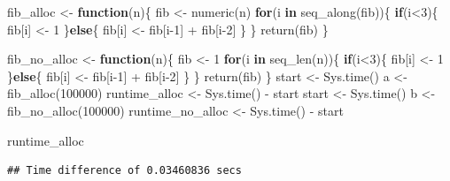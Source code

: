 \documentclass[
]{book}
\newenvironment{Shaded}{\begin{snugshade}}{\end{snugshade}}
\newcommand{\ControlFlowTok}[1]{\textcolor[rgb]{0.13,0.29,0.53}{\textbf{#1}}}
\newcommand{\DecValTok}[1]{\textcolor[rgb]{0.00,0.00,0.81}{#1}}
\newcommand{\FunctionTok}[1]{\textcolor[rgb]{0.00,0.00,0.00}{#1}}
\newcommand{\NormalTok}[1]{#1}
\newcommand{\OtherTok}[1]{\textcolor[rgb]{0.56,0.35,0.01}{#1}}
\newcommand{\SpecialCharTok}[1]{\textcolor[rgb]{0.00,0.00,0.00}{#1}}
\begin{document}
\begin{Shaded}
\begin{Highlighting}[]
\NormalTok{fib\_alloc }\OtherTok{\textless{}{-}} \ControlFlowTok{function}\NormalTok{(n)\{}
\NormalTok{  fib }\OtherTok{\textless{}{-}} \FunctionTok{numeric}\NormalTok{(n)}
  \ControlFlowTok{for}\NormalTok{(i }\ControlFlowTok{in} \FunctionTok{seq\_along}\NormalTok{(fib))\{}
    \ControlFlowTok{if}\NormalTok{(i}\SpecialCharTok{\textless{}}\DecValTok{3}\NormalTok{)\{ }
\NormalTok{      fib[i] }\OtherTok{\textless{}{-}} \DecValTok{1}
\NormalTok{    \}}\ControlFlowTok{else}\NormalTok{\{}
\NormalTok{      fib[i] }\OtherTok{\textless{}{-}}\NormalTok{ fib[i}\DecValTok{{-}1}\NormalTok{] }\SpecialCharTok{+}\NormalTok{ fib[i}\DecValTok{{-}2}\NormalTok{] }
\NormalTok{    \}}
\NormalTok{  \}}
  \FunctionTok{return}\NormalTok{(fib)}
\NormalTok{\}}


\NormalTok{fib\_no\_alloc }\OtherTok{\textless{}{-}} \ControlFlowTok{function}\NormalTok{(n)\{}
\NormalTok{  fib }\OtherTok{\textless{}{-}} \DecValTok{1}
  \ControlFlowTok{for}\NormalTok{(i }\ControlFlowTok{in} \FunctionTok{seq\_len}\NormalTok{(n))\{}
    \ControlFlowTok{if}\NormalTok{(i}\SpecialCharTok{\textless{}}\DecValTok{3}\NormalTok{)\{ }
\NormalTok{      fib[i] }\OtherTok{\textless{}{-}} \DecValTok{1}
\NormalTok{    \}}\ControlFlowTok{else}\NormalTok{\{}
\NormalTok{      fib[i] }\OtherTok{\textless{}{-}}\NormalTok{ fib[i}\DecValTok{{-}1}\NormalTok{] }\SpecialCharTok{+}\NormalTok{ fib[i}\DecValTok{{-}2}\NormalTok{] }
\NormalTok{    \}}
\NormalTok{  \}}
  \FunctionTok{return}\NormalTok{(fib)}
\NormalTok{\}}
\NormalTok{start }\OtherTok{\textless{}{-}} \FunctionTok{Sys.time}\NormalTok{()}
\NormalTok{a }\OtherTok{\textless{}{-}} \FunctionTok{fib\_alloc}\NormalTok{(}\DecValTok{100000}\NormalTok{)}
\NormalTok{runtime\_alloc }\OtherTok{\textless{}{-}} \FunctionTok{Sys.time}\NormalTok{() }\SpecialCharTok{{-}}\NormalTok{ start}
\NormalTok{start }\OtherTok{\textless{}{-}} \FunctionTok{Sys.time}\NormalTok{()}
\NormalTok{b }\OtherTok{\textless{}{-}} \FunctionTok{fib\_no\_alloc}\NormalTok{(}\DecValTok{100000}\NormalTok{)}
\NormalTok{runtime\_no\_alloc }\OtherTok{\textless{}{-}} \FunctionTok{Sys.time}\NormalTok{() }\SpecialCharTok{{-}}\NormalTok{ start}

\NormalTok{runtime\_alloc}
\end{Highlighting}
\end{Shaded}

\begin{verbatim}
## Time difference of 0.03460836 secs
\end{verbatim}
\end{document}
